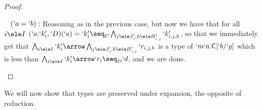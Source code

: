 \documentclass{CSML}
\begin{document}
\begin{proof}
\begin{description}
~\kern-10mm $(`a = `b) : $
Reasoning as in the previous case, but now we have that for all $i\ele I$
$(`a{:}`k'_i,`D)(`a) = `k'_i \seq_C \bigwedge_{j\ele J'_i,h\ele H'_{i,j}} `k'_{i,j,h}$, so that we immediately
get that $\bigwedge_{i\ele I} `k'_i\arrow\bigwedge_{j\ele J'_i,h\ele H'_{i,j}}`r_{i,j,h}$ is a type of 
$`m`a.\textrm{\sf C}[`b/`g]$ which is less
than $\bigwedge_{i\ele I} `k'_i\arrow`r_i \seq_D `d$, and we are done.
\qedhere

 \end{description}
 \end{proof}


\noindent We will now show that types are preserved under expansion, the opposite of reduction.
\end{document}
